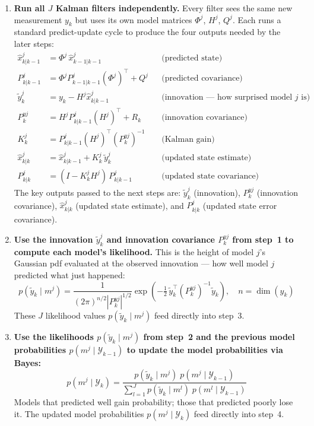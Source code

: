 \documentclass[12pt, a4paper]{article}
\begin{document}
\begin{enumerate}[leftmargin=1.5em, itemsep=8pt]

  \item \textbf{Run all $J$ Kalman filters independently.}
    Every filter sees the same new measurement $y_k$ but uses its own
    model matrices $\Phi^j$, $H^j$, $Q^j$.
    Each runs a standard predict-update cycle to produce the four
    outputs needed by the later steps:
    \begin{align*}
      \hat{x}_{k|k-1}^j &= \Phi^j\,\hat{x}_{k-1|k-1}^j
        & &\text{(predicted state)} \\
      P_{k|k-1}^j &= \Phi^j P_{k-1|k-1}^j (\Phi^j)^\top + Q^j
        & &\text{(predicted covariance)} \\
      \tilde{y}_k^j &= y_k - H^j\hat{x}_{k|k-1}^j
        & &\text{(innovation --- how surprised model $j$ is)} \\
      P_k^{yj} &= H^j P_{k|k-1}^j (H^j)^\top + R_k
        & &\text{(innovation covariance)} \\
      K_k^j &= P_{k|k-1}^j (H^j)^\top (P_k^{yj})^{-1}
        & &\text{(Kalman gain)} \\
      \hat{x}_{k|k}^j &= \hat{x}_{k|k-1}^j + K_k^j\,\tilde{y}_k^j
        & &\text{(updated state estimate)} \\
      P_{k|k}^j &= (I - K_k^j H^j)\,P_{k|k-1}^j
        & &\text{(updated state covariance)}
    \end{align*}
    The key outputs passed to the next steps are:
    $\tilde{y}_k^j$ (innovation),
    $P_k^{yj}$ (innovation covariance),
    $\hat{x}_{k|k}^j$ (updated state estimate), and
    $P_{k|k}^j$ (updated state error covariance).

  \item \textbf{Use the innovation $\tilde{y}_k^j$ and innovation
    covariance $P_k^{yj}$ from step~1 to compute each model's
    likelihood.}
    This is the height of model $j$'s Gaussian pdf evaluated at the
    observed innovation --- how well model $j$ predicted what just
    happened:
    \[
      p(\tilde{y}_k \mid m^j)
      = \frac{1}{(2\pi)^{n/2}|P_k^{yj}|^{1/2}}
        \exp\!\left(
          -\tfrac{1}{2}\,\tilde{y}_k^\top (P_k^{yj})^{-1}\tilde{y}_k
        \right), \quad n = \dim(y_k)
    \]
    These $J$ likelihood values $p(\tilde{y}_k \mid m^j)$ feed directly
    into step~3.

  \item \textbf{Use the likelihoods $p(\tilde{y}_k \mid m^j)$ from
    step~2 and the previous model probabilities
    $p(m^j \mid \mathcal{Y}_{k-1})$ to update the model probabilities
    via Bayes:}
    \[
      p(m^j \mid \mathcal{Y}_k)
      = \frac{p(\tilde{y}_k \mid m^j)\;p(m^j \mid \mathcal{Y}_{k-1})}
             {\displaystyle\sum_{l=1}^{J}
              p(\tilde{y}_k \mid m^l)\;p(m^l \mid \mathcal{Y}_{k-1})}
    \]
    Models that predicted well gain probability; those that predicted
    poorly lose it.
    The updated model probabilities $p(m^j \mid \mathcal{Y}_k)$ feed
    directly into step~4.


\end{enumerate}
\end{document}
